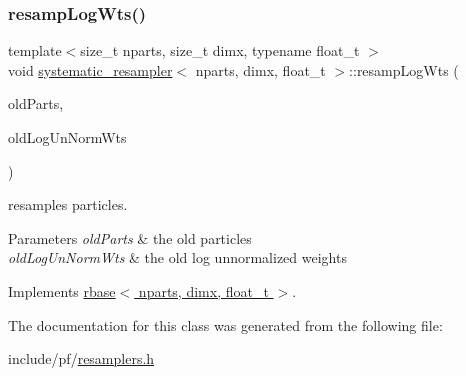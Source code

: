 \subsubsection{\texorpdfstring{resamp\+Log\+Wts()}{resampLogWts()}}
{\footnotesize\ttfamily template$<$size\+\_\+t nparts, size\+\_\+t dimx, typename float\+\_\+t $>$ \\
void \hyperlink{classsystematic__resampler}{systematic\+\_\+resampler}$<$ nparts, dimx, float\+\_\+t $>$\+::resamp\+Log\+Wts (\begin{DoxyParamCaption}\item[{\hyperlink{classrbase_aa12fc826befa6ba0647b5f59ebc396ee}{array\+Vec} \&}]{old\+Parts,  }\item[{\hyperlink{classrbase_a6f76bef853e508cb5b6f546d231b06f5}{array\+Float} \&}]{old\+Log\+Un\+Norm\+Wts }\end{DoxyParamCaption})\hspace{0.3cm}{\ttfamily [virtual]}}



resamples particles. 


\begin{DoxyParams}{Parameters}
{\em old\+Parts} & the old particles \\
\hline
{\em old\+Log\+Un\+Norm\+Wts} & the old log unnormalized weights \\
\hline
\end{DoxyParams}


Implements \hyperlink{classrbase_aff0f6f88fd4656e67f5ebc870f10dd44}{rbase$<$ nparts, dimx, float\+\_\+t $>$}.



The documentation for this class was generated from the following file\+:\begin{DoxyCompactItemize}
\item 
include/pf/\hyperlink{resamplers_8h}{resamplers.\+h}\end{DoxyCompactItemize}
